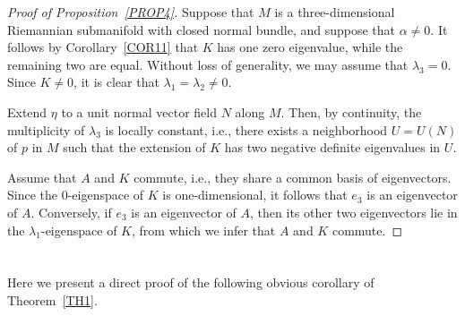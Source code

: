 \documentclass[a4paper,12pt,oneside]{amsart}
\theoremstyle{plain}
\theoremstyle{remark}
\theoremstyle{definition}
\begin{document}
\begin{proof}[Proof of Proposition~\ref{PROP4}]
Suppose that $M$ is a three-dimensional Riemannian submanifold with closed normal bundle, and suppose that $\alpha \neq 0$. It follows by Corollary~\ref{COR11} that $K$ has one zero eigenvalue, while the remaining two are equal. Without loss of generality, we may assume that $\lambda_{3}=0$. Since $K \neq 0$, it is clear that $\lambda_{1}=\lambda_{2}\neq0$.

Extend $\eta$ to a unit normal vector field $N$ along $M$. Then, by continuity, the multiplicity of $\lambda_{3}$ is locally constant, i.e., there exists a neighborhood $U=U(N)$ of $p$ in $M$ such that the extension of $K$ has two negative definite eigenvalues in $U$.

Assume that $A$ and $K$ commute, i.e., they share a common basis of eigenvectors. Since the $0$-eigenspace of $K$ is one-dimensional, it follows that $e_{3}$ is an eigenvector of $A$. Conversely, if $e_{3}$ is an eigenvector of $A$, then its other two eigenvectors lie in the $\lambda_{1}$-eigenspace of $K$, from which we infer that $A$ and $K$ commute.
%
\end{proof}

\appendix
\section{} \label{APPA}
Here we present a direct proof of the following obvious corollary of Theorem~\ref{TH1}.
\end{document}
